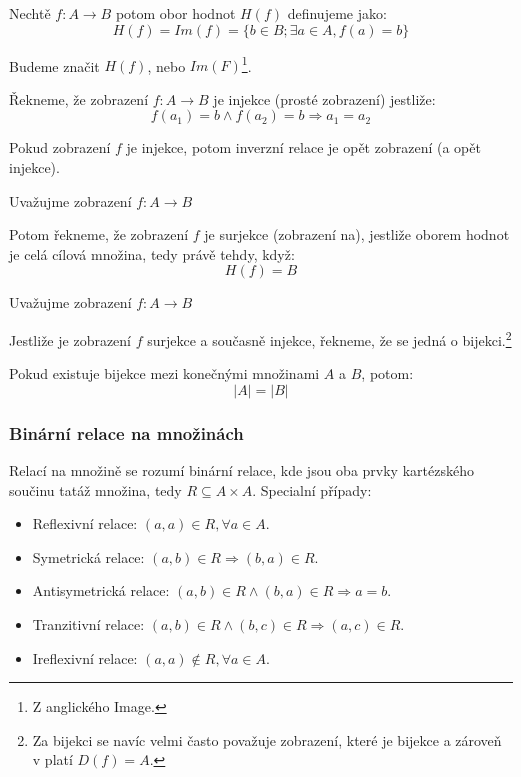 \begin{definition}
	Nechtě $f: A \rightarrow B$ potom obor hodnot $H(f)$ definujeme jako:
	$$H(f) = Im(f) = \{b \in B; \exists a \in A, f(a) = b\}$$

	Budeme značit $H(f)$, nebo $Im(F)$\footnote{Z anglického Image.}.
\end{definition}

\begin{definition}
	Řekneme, že zobrazení $f: A \rightarrow B$ je injekce (prosté zobrazení)
	jestliže: $$f(a_1) = b \wedge f(a_2) = b \Rightarrow a_1 = a_2$$

	Pokud zobrazení $f$ je injekce,
	potom inverzní relace je opět zobrazení (a opět injekce).
\end{definition}

\begin{definition}[Surjekce]
	Uvažujme zobrazení $f: A \rightarrow B$

	Potom řekneme, že zobrazení $f$ je surjekce (zobrazení na),
	jestliže oborem hodnot je celá cílová množina, tedy právě tehdy, když:
	$$H(f) = B$$
\end{definition}

\begin{definition}[Bijekce]
	Uvažujme zobrazení $f: A \rightarrow B$

	Jestliže je zobrazení $f$ surjekce a současně injekce,
	řekneme, že se jedná o bijekci.\footnote{Za bijekci se navíc velmi
	často považuje zobrazení, které je bijekce a zároveň v platí $D(f) = A$.}

	Pokud existuje bijekce mezi konečnými množinami $A$ a $B$, potom:
	$$|A| = |B|$$
\end{definition}

\subsubsection*{Binární relace na množinách}
Relací na množině se rozumí binární relace, kde jsou oba prvky kartézského součinu tatáž
množina, tedy $R \subseteq A \times A$.
Specialní případy:
\begin{itemize}
	\item Reflexivní relace: $(a, a) \in R, \forall a \in A$.
	\item Symetrická relace: $(a, b) \in R \Rightarrow (b, a) \in R$.
	\item Antisymetrická relace: $(a, b) \in R \wedge (b, a) \in R \Rightarrow a = b$.
	\item Tranzitivní relace: $(a, b) \in R \wedge (b, c) \in R \Rightarrow (a, c) \in R$.
	\item Ireflexivní relace: $(a, a) \notin R, \forall a \in A$.
\end{itemize}

